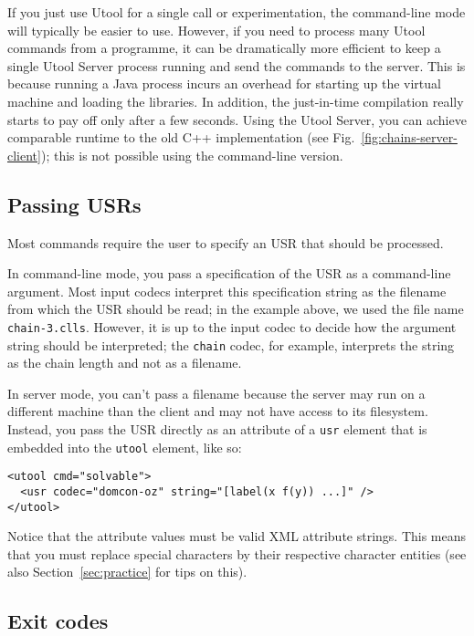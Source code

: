 If you just use Utool for a single call or experimentation, the
command-line mode will typically be easier to use. However, if you
need to process many Utool commands from a programme, it can be
dramatically more efficient to keep a single Utool Server process
running and send the commands to the server. This is because running a
Java process incurs an overhead for starting up the virtual machine
and loading the libraries. In addition, the just-in-time compilation
really starts to pay off only after a few seconds. Using the Utool
Server, you can achieve comparable runtime to the old C++
implementation (see Fig.~\ref{fig:chains-server-client}); this is not
possible using the command-line version.


\subsection{Passing USRs}

Most commands require the user to specify an USR that should be
processed.

In command-line mode, you pass a specification of the USR as a
command-line argument. Most input codecs interpret this specification
string as the filename from which the USR should be read; in the
example above, we used the file name \verb?chain-3.clls?. However, it
is up to the input codec to decide how the argument string should be
interpreted; the \verb?chain? codec, for example, interprets the
string as the chain length and not as a filename.

In server mode, you can't pass a filename because the server may run
on a different machine than the client and may not have access to its
filesystem. Instead, you pass the USR directly as an attribute of a
\verb?usr? element that is embedded into the \verb?utool? element,
like so:

\begin{verbatim}
<utool cmd="solvable">
  <usr codec="domcon-oz" string="[label(x f(y)) ...]" />
</utool>
\end{verbatim}

Notice that the attribute values must be valid XML attribute
strings. This means that you must replace special characters by
their respective character entities (see also
Section~\ref{sec:practice} for tips on this).


\subsection{Exit codes}

